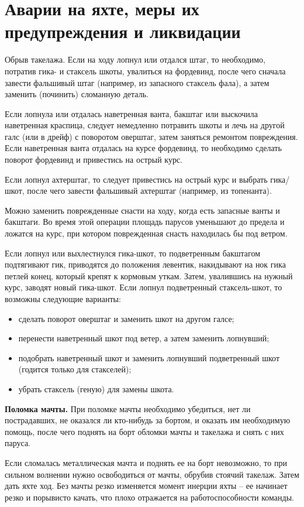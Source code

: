 \documentclass[a4paper, 12pt, twoside, final, book, russian, fittopage, cyremdash]{ncc}
\begin{document}
\section{Аварии на яхте, меры их предупреждения и ликвидации}

Обрыв такелажа. Если на ходу лопнул или отдался штаг, то необходимо, потратив гика- и стаксель шкоты, увалиться на фордевинд, после чего сначала завести фальшивый штаг (например, из запасного стаксель фала), а затем заменить (починить) сломанную деталь.

Если лопнула или отдалась наветренная ванта, бакштаг или выскочила наветренная краспица, следует немедленно потравить шкоты и лечь на другой галс (или в дрейф) с поворотом оверштаг, затем заняться ремонтом повреждения. Если наветренная ванта отдалась на курсе фордевинд, то необходимо сделать поворот фордевинд и привестись на острый курс.

Если лопнул ахтерштаг, то следует привестись на острый курс и выбрать гика\-/шкот, после чего завести фальшивый ахтерштаг (например, из топенанта).

Можно заменить поврежденные снасти на ходу, когда есть запасные ванты и бакштаги. Во время этой операции площадь парусов уменьшают до предела и ложатся на курс, при котором поврежденная снасть находилась бы под ветром.

Если лопнул или выхлестнулся гика-шкот, то подветренным бакштагом подтягивают гик, приводятся до положения левентик, накидывают на нок гика петлей конец, который крепят к кормовым уткам. Затем, увалившись на нужный курс, заводят новый гика-шкот.
Если лопнул подветренный стаксель-шкот, то возможны следующие варианты: 
\begin{itemize}
\item сделать поворот оверштаг и заменить шкот на другом галсе; 
\item перенести наветренный шкот под ветер, а затем заменить лопнувший; 
\item подобрать наветренный шкот и заменить лопнувший подветренный шкот (годится только для стакселей); 
\item убрать стаксель (геную) для замены шкота. 
\end{itemize}

\textbf{Поломка мачты.} При поломке мачты необходимо убедиться, нет ли пострадавших, не оказался ли кто-нибудь за бортом, и оказать им необходимую помощь, после чего поднять на борт обломки мачты и такелажа и снять с них паруса.

Если сломалась металлическая мачта и поднять ее на борт невозможно, то при сильном волнении нужно освободиться от мачты, обрубив стоячий такелаж. Затем дать яхте ход. Без мачты резко изменяется момент инерции яхты \--- ее начинает резко и порывисто качать, что плохо отражается на работоспособности команды.
\end{document}
